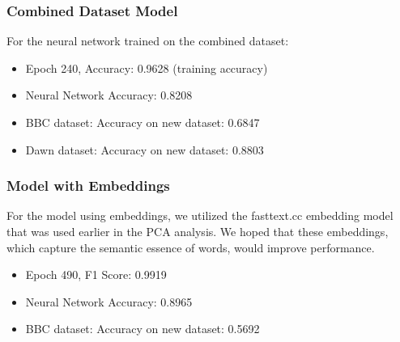 \documentclass[sigconf]{acmart}
\begin{document}

\subsubsection{Combined Dataset Model}

For the neural network trained on the combined dataset:

\begin{itemize}
    \item Epoch 240, Accuracy: 0.9628 (training accuracy)
    \item Neural Network Accuracy: 0.8208
    \item BBC dataset: Accuracy on new dataset: 0.6847
    \item Dawn dataset: Accuracy on new dataset: 0.8803
\end{itemize}


\subsubsection{Model with Embeddings}

For the model using embeddings, we utilized the fasttext.cc embedding model that was used earlier in the PCA analysis. We hoped that these embeddings, which capture the semantic essence of words, would improve performance.

\begin{itemize}
    \item Epoch 490, F1 Score: 0.9919
    \item Neural Network Accuracy: 0.8965
    \item BBC dataset: Accuracy on new dataset: 0.5692
\end{itemize}
\end{document}
